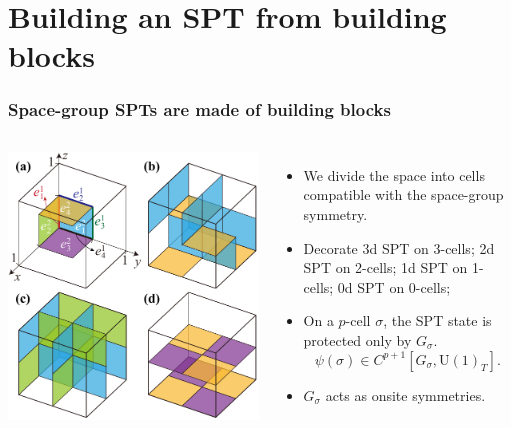 \documentclass[xcolor=table, 10pt, aspectratio=43]{beamer}
\newcommand{\uone}{\mathrm U(1)}
\begin{document}
\section{Building an SPT from building blocks}
\begin{frame}
	\frametitle{Space-group SPTs are made of building blocks}
	\begin{columns}
		\begin{center}
			\includegraphics[width=\textwidth]{blocks}
		\end{center}
		\begin{itemize}
			\item We divide the space into cells compatible with the space-group symmetry.
			\item Decorate 3d SPT on 3-cells; 2d SPT on 2-cells; 1d SPT on 1-cells; 0d SPT on 0-cells;
			\item On a $p$-cell $\sigma$, the SPT state is protected only by $G_\sigma$.
			\[\psi(\sigma)\in C^{p+1}[G_\sigma,\uone_T].\]
			\item $G_\sigma$ acts as onsite symmetries.
		\end{itemize}
	\end{columns}
\end{frame}
\end{document}
